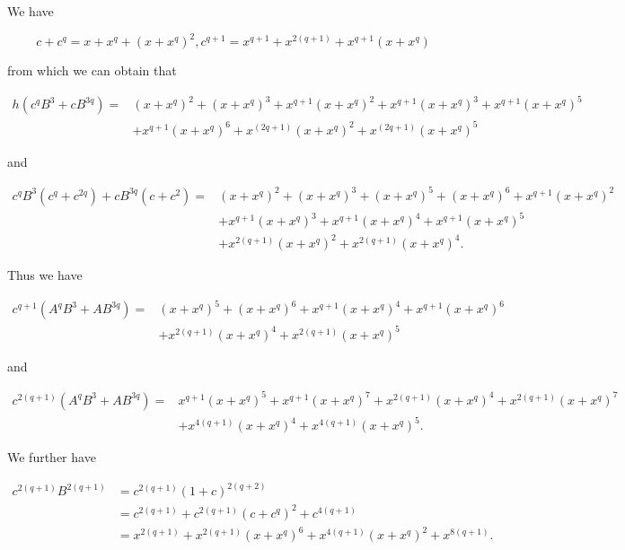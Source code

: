 \documentclass[10pt]{article}
\begin{document}
We have

$$
c+c^{q}=x+x^{q}+\left(x+x^{q}\right)^{2}, c^{q+1}=x^{q+1}+x^{2(q+1)}+x^{q+1}\left(x+x^{q}\right)
$$

from which we can obtain that

$$
\begin{aligned}
h\left(c^{q} B^{3}+c B^{3 q}\right)= & \left(x+x^{q}\right)^{2}+\left(x+x^{q}\right)^{3}+x^{q+1}\left(x+x^{q}\right)^{2}+x^{q+1}\left(x+x^{q}\right)^{3}+x^{q+1}\left(x+x^{q}\right)^{5} \\
& +x^{q+1}\left(x+x^{q}\right)^{6}+x^{(2 q+1)}\left(x+x^{q}\right)^{2}+x^{(2 q+1)}\left(x+x^{q}\right)^{5}
\end{aligned}
$$

and

$$
\begin{aligned}
c^{q} B^{3}\left(c^{q}+c^{2 q}\right)+c B^{3 q}\left(c+c^{2}\right)= & \left(x+x^{q}\right)^{2}+\left(x+x^{q}\right)^{3}+\left(x+x^{q}\right)^{5}+\left(x+x^{q}\right)^{6}+x^{q+1}\left(x+x^{q}\right)^{2} \\
& +x^{q+1}\left(x+x^{q}\right)^{3}+x^{q+1}\left(x+x^{q}\right)^{4}+x^{q+1}\left(x+x^{q}\right)^{5} \\
& +x^{2(q+1)}\left(x+x^{q}\right)^{2}+x^{2(q+1)}\left(x+x^{q}\right)^{4} .
\end{aligned}
$$

Thus we have

$$
\begin{aligned}
c^{q+1}\left(A^{q} B^{3}+A B^{3 q}\right)= & \left(x+x^{q}\right)^{5}+\left(x+x^{q}\right)^{6}+x^{q+1}\left(x+x^{q}\right)^{4}+x^{q+1}\left(x+x^{q}\right)^{6} \\
& +x^{2(q+1)}\left(x+x^{q}\right)^{4}+x^{2(q+1)}\left(x+x^{q}\right)^{5}
\end{aligned}
$$

and

$$
\begin{aligned}
c^{2(q+1)}\left(A^{q} B^{3}+A B^{3 q}\right)= & x^{q+1}\left(x+x^{q}\right)^{5}+x^{q+1}\left(x+x^{q}\right)^{7}+x^{2(q+1)}\left(x+x^{q}\right)^{4}+x^{2(q+1)}\left(x+x^{q}\right)^{7} \\
& +x^{4(q+1)}\left(x+x^{q}\right)^{4}+x^{4(q+1)}\left(x+x^{q}\right)^{5} .
\end{aligned}
$$

We further have

$$
\begin{aligned}
c^{2(q+1)} B^{2(q+1)} & =c^{2(q+1)}(1+c)^{2(q+2)} \\
& =c^{2(q+1)}+c^{2(q+1)}\left(c+c^{q}\right)^{2}+c^{4(q+1)} \\
& =x^{2(q+1)}+x^{2(q+1)}\left(x+x^{q}\right)^{6}+x^{4(q+1)}\left(x+x^{q}\right)^{2}+x^{8(q+1)} .
\end{aligned}
$$
\end{document}
